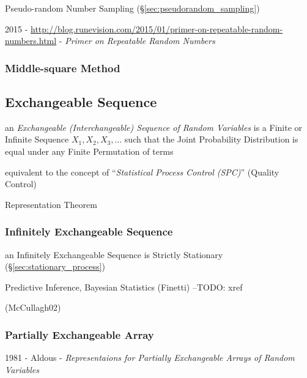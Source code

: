 \fist Pseudo-random Number Sampling (\S\ref{sec:pseudorandom_sampling})

2015 -
\url{http://blog.runevision.com/2015/01/primer-on-repeatable-random-numbers.html}
- \emph{Primer on Repeatable Random Numbers}



\subsubsection{Middle-square Method}\label{sec:middle_square_method}



\subsection{Exchangeable Sequence}\label{sec:exchangeable_sequence}

an \emph{Exchangeable (Interchangeable) Sequence of Random Variables} is a
Finite or Infinite Sequence $X_1, X_2, X_3, \ldots$ such that the Joint
Probability Distribution is equal under any Finite Permutation of terms

equivalent to the concept of ``\emph{Statistical Process Control (SPC)}''
(Quality Control)

Representation Theorem



\subsubsection{Infinitely Exchangeable Sequence}
\label{sec:infinitely_exchangeable}

an Infinitely Exchangeable Sequence is Strictly Stationary
(\S\ref{sec:stationary_process})

Predictive Inference, Bayesian Statistics (Finetti) --TODO: xref

(McCullagh02)



\subsubsection{Partially Exchangeable Array}
\label{sec:partially_exchangeable}

1981 - Aldous -
\emph{Representaions for Partially Exchangeable Arrays of Random Variables}

